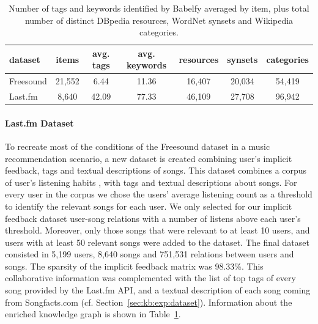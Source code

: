 \begin{table}
\scriptsize
	\label{tbl:graph-rec:datasets}
	\begin{tabular}{l c c c c c c}
		\toprule
		\textbf{dataset} & \textbf{items} & \textbf{avg. tags} & \textbf{avg. keywords} & \textbf{resources} & \textbf{synsets} & \textbf{categories}\\
		\midrule
		Freesound & 21,552 & 6.44 & 11.36 & 16,407 & 20,034 & 54,419 \\
		Last.fm & 8,640 & 42.09 & 77.33 & 46,109 & 27,708 & 96,942 \\
		\bottomrule
		
	\end{tabular}
	\caption[Number of tags and keywords.]{Number of tags and keywords identified by Babelfy averaged by item, plus total number of distinct DBpedia resources, WordNet synsets and Wikipedia categories.
	}
\end{table}


\paragraph*{\textbf{Last.fm Dataset}}\label{fs_dataset}
To recreate most of the conditions of the Freesound dataset in a music recommendation scenario, a new dataset is created combining user's implicit feedback, tags and textual descriptions of songs. This dataset combines a corpus of user's listening habits \citep{Vigliensoni2014}, with tags and textual descriptions about songs. For every user in the corpus we chose the users' average listening count as a threshold to identify the relevant songs for each user. We only selected for our implicit feedback dataset user-song relations with a number of listens above each user's threshold. Moreover, only those songs that were relevant to at least 10 users, and users with at least 50 relevant songs were added to the dataset. The final dataset consisted in 5,199 users, 8,640 songs and 751,531 relations between users and songs. The sparsity of the implicit feedback matrix was 98.33\%.
This collaborative information was complemented with the list of top tags of every song provided by the Last.fm API, and a textual description of each song coming from Songfacts.com (cf. Section~\ref{sec:kb:exp:dataset}). Information about the enriched knowledge graph is shown in Table~\ref{tbl:graph-rec:datasets}.



